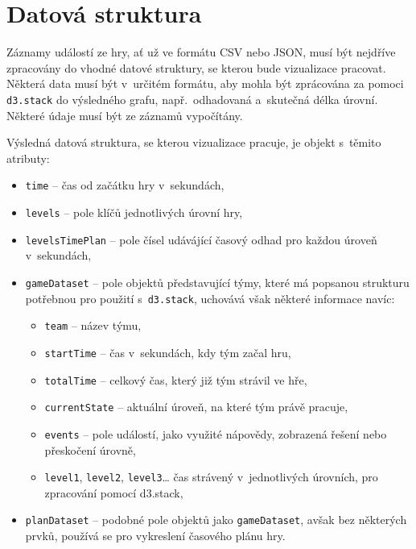 \documentclass[
  digital, %
  oneside, %
  table,   %
  nolof,     %
  nolot,     %
]{fithesis3}
\begin{document}
\section{Datová struktura}
Záznamy událostí ze hry, ať už ve formátu CSV nebo JSON, musí být nejdříve zpracovány do vhodné datové struktury, se kterou bude vizualizace pracovat. Některá data musí být v~určitém formátu, aby mohla být zprácována za pomoci \verb|d3.stack| do výsledného grafu, např.~odhadovaná a~skutečná délka úrovní. Některé údaje musí být ze záznamů vypočítány.\par
Výsledná datová struktura, se kterou vizualizace pracuje, je objekt s~těmito atributy:
\begin{itemize}
  \item \verb|time| – čas od začátku hry v~sekundách,
  \item \verb|levels| – pole klíčů jednotlivých úrovní hry,
  \item \verb|levelsTimePlan| – pole čísel udávájící časový odhad pro každou úroveň v~sekundách,
  \item \verb|gameDataset| – pole objektů představující týmy, které má popsanou strukturu potřebnou pro použití s~\verb|d3.stack|, uchovává však některé informace navíc:
  	\begin{itemize}
		\item \verb|team| – název týmu,
		\item \verb|startTime| – čas v~sekundách, kdy tým začal hru,
		\item \verb|totalTime| – celkový čas, který již tým strávil ve hře,
		\item \verb|currentState| – aktuální úroveň, na které tým právě pracuje,
		\item \verb|events| – pole událostí, jako využité nápovědy, zobrazená řešení nebo přeskočení úrovně,
		\item \verb|level1|, \verb|level2|, \verb|level3|… čas strávený v~jednotlivých úrovních, pro zpracování pomocí d3.stack,
	\end{itemize}
  \item \verb|planDataset| – podobné pole objektů jako \verb|gameDataset|, avšak bez některých prvků, používá se pro vykreslení časového plánu hry.
\end{itemize}
\end{document}
